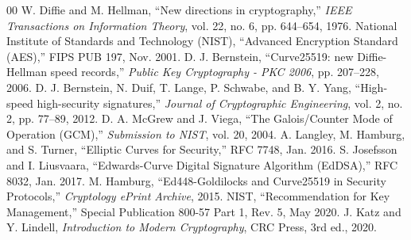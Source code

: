 \documentclass[conference]{IEEEtran}
\begin{document}
\begin{thebibliography}{00}
 W. Diffie and M. Hellman, ``New directions in cryptography,'' \emph{IEEE Transactions on Information Theory}, vol. 22, no. 6, pp. 644--654, 1976.
 National Institute of Standards and Technology (NIST), ``Advanced Encryption Standard (AES),'' FIPS PUB 197, Nov. 2001.
 D. J. Bernstein, ``Curve25519: new Diffie-Hellman speed records,'' \emph{Public Key Cryptography - PKC 2006}, pp. 207--228, 2006.
 D. J. Bernstein, N. Duif, T. Lange, P. Schwabe, and B. Y. Yang, ``High-speed high-security signatures,'' \emph{Journal of Cryptographic Engineering}, vol. 2, no. 2, pp. 77--89, 2012.
 D. A. McGrew and J. Viega, ``The Galois/Counter Mode of Operation (GCM),'' \emph{Submission to NIST}, vol. 20, 2004.
 A. Langley, M. Hamburg, and S. Turner, ``Elliptic Curves for Security,'' RFC 7748, Jan. 2016.
 S. Josefsson and I. Liusvaara, ``Edwards-Curve Digital Signature Algorithm (EdDSA),'' RFC 8032, Jan. 2017.
 M. Hamburg, ``Ed448-Goldilocks and Curve25519 in Security Protocols,'' \emph{Cryptology ePrint Archive}, 2015.
 NIST, ``Recommendation for Key Management,'' Special Publication 800-57 Part 1, Rev. 5, May 2020.
 J. Katz and Y. Lindell, \emph{Introduction to Modern Cryptography}, CRC Press, 3rd ed., 2020.
\end{thebibliography}
\end{document}
